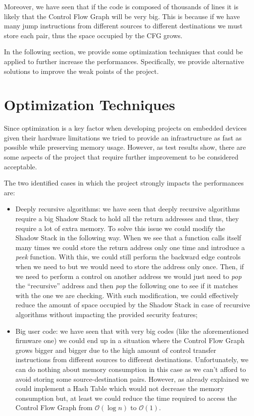 Moreover, we have seen that if the code is composed of thousands of lines it is
likely that the Control Flow Graph will be very big. This is because if we have many
jump instructions from different sources to different destinations we must store
each pair, thus the space occupied by the CFG grows.

In the following section, we provide some optimization techniques that could be applied
to further increase the performances. Specifically, we provide alternative solutions
to improve the weak points of the project.

\section{Optimization Techniques}
\label{sec:pa_optimization}

Since optimization is a key factor when developing projects on embedded devices
given their hardware limitations we tried to provide an infrastructure as fast
as possible while preserving memory usage. However, as test results show, there are
some aspects of the project that require further improvement to be considered acceptable.

The two identified cases in which the project strongly impacts the performances are:
\begin{itemize}
  \item Deeply recursive algorithms: we have seen that deeply recursive
    algorithms require a big Shadow Stack to hold all the return addresses and
    thus, they require a lot of extra memory. To solve this issue we could
    modify the Shadow Stack in the following way. When we see that a function calls
    itself many times we could store the return address only one time and introduce
    a \textit{peek} function. With this, we could still perform the backward
    edge controls when we need to but we would need to store the address only
    once. Then, if we need to perform a control on another address we would just
    need to \textit{pop} the ``recursive'' address and then \textit{pop} the
    following one to see if it matches with the one we are checking. With such modification,
    we could effectively reduce the amount of space occupied by the Shadow Stack
    in case of recursive algorithms without impacting the provided security
    features;

  \item Big user code: we have seen that with very big codes (like the aforementioned
    firmware one) we could end up in a situation where the Control Flow Graph
    grows bigger and bigger due to the high amount of control transfer
    instructions from different sources to different destinations. Unfortunately,
    we can do nothing about memory consumption in this case as we can't afford
    to avoid storing some source-destination pairs. However, as already
    explained we could implement a Hash Table which would not decrease the
    memory consumption but, at least we could reduce the time required to access
    the Control Flow Graph from $\mathcal{O}(\log{n})$ to $\mathcal{O}(1)$.
\end{itemize}

